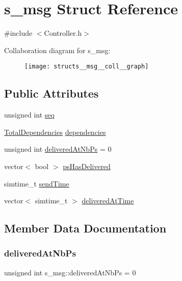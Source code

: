 \hypertarget{structs__msg}{}\section{s\+\_\+msg Struct Reference}
\label{structs__msg}


{\ttfamily \#include $<$Controller.\+h$>$}



Collaboration diagram for s\+\_\+msg\+:\nopagebreak
\begin{figure}[H]
\begin{center}
\leavevmode
\texttt{[image: structs\_\_msg\_\_coll\_\_graph]}
\end{center}
\end{figure}
\subsection*{Public Attributes}
\begin{DoxyCompactItemize}
\item 
unsigned int \hyperlink{structs__msg_a81ee20a1e6b791fdc215d88c0418e618}{seq}
\item 
\hyperlink{class_total_dependencies}{Total\+Dependencies} \hyperlink{structs__msg_a0683a931a64bb9e40c4da98dbd5bc836}{dependencies}
\item 
unsigned int \hyperlink{structs__msg_a88a6cac0463627f92d12acb67755186d}{delivered\+At\+Nb\+Ps} = 0
\item 
vector$<$ bool $>$ \hyperlink{structs__msg_ac9b1dd0616f30d1eadfdeda272e1b238}{ps\+Has\+Delivered}
\item 
simtime\+\_\+t \hyperlink{structs__msg_abf4a4c8c468860dec56cb8d69aba81b3}{send\+Time}
\item 
vector$<$ simtime\+\_\+t $>$ \hyperlink{structs__msg_a25acd8d8afeacf207f402c8362fe452c}{delivered\+At\+Time}
\end{DoxyCompactItemize}


\subsection{Member Data Documentation}
\mbox{\label{structs__msg_a88a6cac0463627f92d12acb67755186d}} 
\subsubsection{\texorpdfstring{delivered\+At\+Nb\+Ps}{deliveredAtNbPs}}
{\footnotesize\ttfamily unsigned int s\+\_\+msg\+::delivered\+At\+Nb\+Ps = 0}

